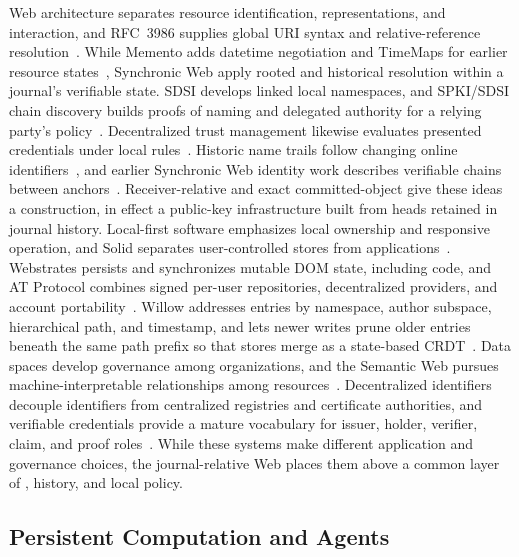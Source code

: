 Web architecture separates resource identification, representations, and interaction, and RFC~3986 supplies global URI syntax and relative-reference resolution~\cite{Jacobs2004webarch,BernersLee2005uri}. While Memento adds datetime negotiation and TimeMaps for earlier resource states~\cite{VanDeSompel2013memento}, Synchronic Web  apply rooted and historical resolution within a journal's verifiable state. SDSI develops linked local namespaces, and SPKI/SDSI chain discovery builds proofs of naming and delegated authority for a relying party's policy~\cite{Rivest1996sdsi,Clarke2001chain}. Decentralized trust management likewise evaluates presented credentials under local rules~\cite{Blaze1996trust}. Historic name trails follow changing online identifiers~\cite{Maniatis2003hints}, and earlier Synchronic Web identity work describes verifiable chains between anchors~\cite{dinh2025identity}. Receiver-relative  and exact committed-object  give these ideas a construction, in effect a public-key infrastructure built from heads retained in journal history. Local-first software emphasizes local ownership and responsive operation, and Solid separates user-controlled stores from applications~\cite{Kleppmann2019local,Mansour2016solid}. Webstrates persists and synchronizes mutable DOM state, including code, and AT Protocol combines signed per-user repositories, decentralized providers, and account portability~\cite{Klokmose2015webstrates,Kleppmann2024bluesky}. Willow addresses entries by namespace, author subspace, hierarchical path, and timestamp, and lets newer writes prune older entries beneath the same path prefix so that stores merge as a state-based CRDT~\cite{Meyer2025willow}. Data spaces develop governance among organizations, and the Semantic Web pursues machine-interpretable relationships among resources~\cite{Otto2019designing,BernersLee2001semantic}. Decentralized identifiers decouple identifiers from centralized registries and certificate authorities, and verifiable credentials provide a mature vocabulary for issuer, holder, verifier, claim, and proof roles~\cite{Sporny2022did,Sedlmeir2021digital}. While these systems make different application and governance choices, the journal-relative Web places them above a common layer of , history, and local policy.

\subsection{Persistent Computation and Agents}

